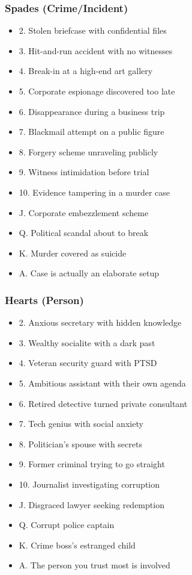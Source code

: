 \documentclass[11pt]{article}
\begin{document}
\subsubsection{Spades (Crime/Incident)}
\begin{itemize}
    \item 2. Stolen briefcase with confidential files
    \item 3. Hit-and-run accident with no witnesses
    \item 4. Break-in at a high-end art gallery
    \item 5. Corporate espionage discovered too late
    \item 6. Disappearance during a business trip
    \item 7. Blackmail attempt on a public figure
    \item 8. Forgery scheme unraveling publicly
    \item 9. Witness intimidation before trial
    \item 10. Evidence tampering in a murder case
    \item J. Corporate embezzlement scheme
    \item Q. Political scandal about to break
    \item K. Murder covered as suicide
    \item A. Case is actually an elaborate setup
\end{itemize}

\subsubsection{Hearts (Person)}
\begin{itemize}
    \item 2. Anxious secretary with hidden knowledge
    \item 3. Wealthy socialite with a dark past
    \item 4. Veteran security guard with PTSD
    \item 5. Ambitious assistant with their own agenda
    \item 6. Retired detective turned private consultant
    \item 7. Tech genius with social anxiety
    \item 8. Politician's spouse with secrets
    \item 9. Former criminal trying to go straight
    \item 10. Journalist investigating corruption
    \item J. Disgraced lawyer seeking redemption
    \item Q. Corrupt police captain
    \item K. Crime boss's estranged child
    \item A. The person you trust most is involved
\end{itemize}
\end{document}
